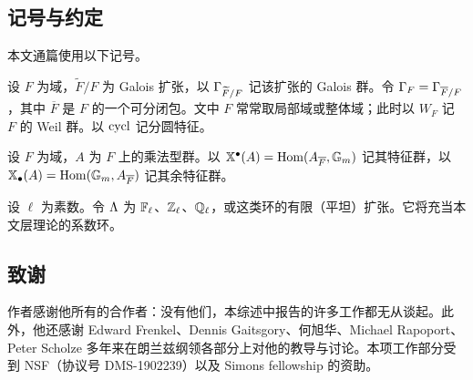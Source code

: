 \subsection*{记号与约定}

本文通篇使用以下记号。

设 $F$ 为域，$\widetilde F/F$ 为 Galois 扩张，以 ${\Gamma}_{\widetilde F/F}$ 记该扩张的 Galois 群。令 ${\Gamma}_F={\Gamma}_{\overline F/F}$，其中 $\overline F$ 是 $F$ 的一个可分闭包。文中 $F$ 常常取局部域或整体域；此时以 $W_F$ 记 $F$ 的 Weil 群。以 ${\operatorname{cycl}}$ 记分圆特征。

设 $F$ 为域，$A$ 为 $F$ 上的乘法型群。以 $\mathbb{X}^\bullet(A)={\operatorname{Hom}}(A_{\overline F},{\mathbb G}_m)$ 记其特征群，以 $\mathbb{X}_\bullet(A)={\operatorname{Hom}}({\mathbb G}_m,A_{\overline F})$ 记其余特征群。

设 $\ell$ 为素数。令 ${\Lambda}$ 为 ${\mathbb F}_\ell$、${\mathbb Z}_\ell$、${\mathbb Q}_\ell$，或这类环的有限（平坦）扩张。它将充当本文层理论的系数环。

\subsection*{致谢}

作者感谢他所有的合作者：没有他们，本综述中报告的许多工作都无从谈起。此外，他还感谢 Edward Frenkel、Dennis Gaitsgory、何旭华、Michael Rapoport、Peter Scholze 多年来在朗兰兹纲领各部分上对他的教导与讨论。本项工作部分受到 NSF（协议号 DMS-1902239）以及 Simons fellowship 的资助。
